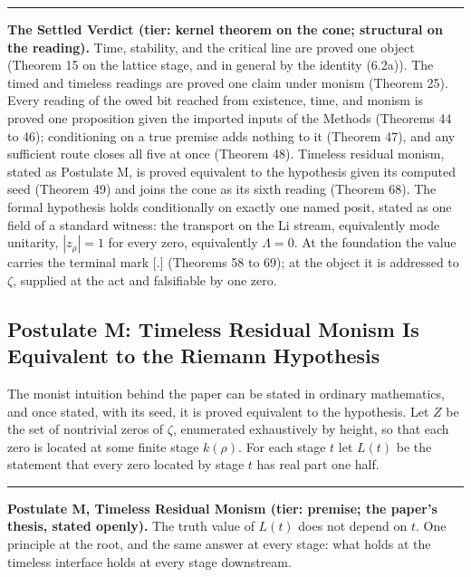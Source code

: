 \documentclass[10pt,twocolumn]{article}
\newcommand{\jboxstart}{\begin{jbox}}
\newcommand{\jboxend}{\end{jbox}}
\newenvironment{jbox}{\par\vspace{2pt}\noindent\color{accent}\rule{\columnwidth}{0.8pt}\par\vspace{-2pt}\small}{\par\vspace{2pt}}
\begin{document}
\jboxstart

\textbf{The Settled Verdict (tier: kernel theorem on the cone;
structural on the reading).} Time, stability, and the critical line are
proved one object (Theorem 15 on the lattice stage, and in general by
the identity (6.2a)). The timed and timeless readings are proved one
claim under monism (Theorem 25). Every reading of the owed bit reached
from existence, time, and monism is proved one proposition given the
imported inputs of the Methods (Theorems 44 to 46); conditioning on a
true premise adds nothing to it (Theorem 47), and any sufficient route
closes all five at once (Theorem 48). Timeless residual monism, stated
as Postulate M, is proved equivalent to the hypothesis given its
computed seed (Theorem 49) and joins the cone as its sixth reading
(Theorem 68). The formal hypothesis holds conditionally on exactly one
named posit, stated as one field of a standard witness: the transport on
the Li stream, equivalently mode unitarity, \(|z_\rho| = 1\) for every
zero, equivalently \(\Lambda = 0\). At the foundation the value carries
the terminal mark {[}.{]} (Theorems 58 to 69); at the object it is
addressed to \(\zeta\), supplied at the act and falsifiable by one zero.

\jboxend

\hypertarget{postulate-m-timeless-residual-monism-is-equivalent-to-the-riemann-hypothesis}{%
\subsection{Postulate M: Timeless Residual Monism Is Equivalent to the
Riemann
Hypothesis}\label{postulate-m-timeless-residual-monism-is-equivalent-to-the-riemann-hypothesis}}

The monist intuition behind the paper can be stated in ordinary
mathematics, and once stated, with its seed, it is proved equivalent to
the hypothesis. Let \(Z\) be the set of nontrivial zeros of \(\zeta\),
enumerated exhaustively by height, so that each zero is located at some
finite stage \(k(\rho)\). For each stage \(t\) let \(L(t)\) be the
statement that every zero located by stage \(t\) has real part one half.

\jboxstart

\textbf{Postulate M, Timeless Residual Monism (tier: premise; the
paper's thesis, stated openly).} The truth value of \(L(t)\) does not
depend on \(t\). One principle at the root, and the same answer at every
stage: what holds at the timeless interface holds at every stage
downstream.
\end{document}
